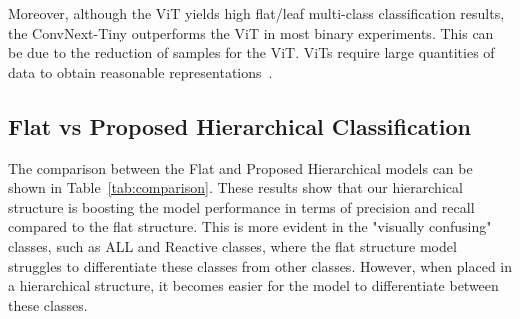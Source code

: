 \documentclass[runningheads]{llncs}
\begin{document}
Moreover, although the ViT yields high flat/leaf multi-class classification results, the ConvNext-Tiny outperforms the ViT in most binary experiments. This can be due to the reduction of samples for the ViT. ViTs require large quantities of data to obtain reasonable representations~\cite{lee2021vision}.

\subsection{Flat vs Proposed Hierarchical Classification}

The comparison between the Flat and Proposed Hierarchical models can be shown in Table~\ref{tab:comparison}. These results show that our hierarchical structure is boosting the model performance in terms of precision and recall compared to the flat structure. This is more evident in the "visually confusing" classes, such as ALL and Reactive classes, where the flat structure model struggles to differentiate these classes from other classes. However, when placed in a hierarchical structure, it becomes easier for the model to differentiate between these classes.
\end{document}

